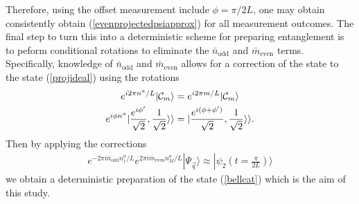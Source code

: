 \documentclass[%
  prx,%
  twocolumn,%
  preprintnumbers,%
  amsmath,%
  amssymb,%
  superscriptaddress%
]{revtex4}
\begin{document}
Therefore, using the offset measurement include $ \phi = \pi/2L$, one may obtain consistently obtain (\ref{evenprojectedpsiapprox}) for all measurement outcomes.  The final step to turn this into a deterministic scheme for preparing entanglement is to peform conditional rotations to eliminate the $ \bar{n}_\text{odd} $ and  $ \bar{m}_\text{even} $ terms.  Specifically, knowledge of $ \bar{n}_\text{odd} $ and  $ \bar{m}_\text{even} $  allows for a correction of the state to the state (\ref{projideal}) using the rotations
%
\begin{align}
e^{i 2 \pi n^a /L } | {\cal C}_m \rangle & = e^{i 2 \pi m /L } | {\cal C}_m \rangle \label{correction1} \\
e^{i \phi n^a } |\frac{e^{ i \phi' }}{\sqrt{2}},\frac{1}{\sqrt{2}}\rangle\rangle & = |\frac{e^{ i (\phi+\phi')  }}{\sqrt{2}},\frac{1}{\sqrt{2}}\rangle\rangle .
\label{correction2} 
\end{align}
%
Then by applying the corrections
%
\begin{align}
e^{-2 \pi i \bar{n}_{\text{odd}}  n^a_1/L }  e^{2 \pi i \bar{m}_{\text{even}}  n^a_M/L }  | \Psi_{\vec{q}} \rangle \approx | \psi_2 (t= \frac{\pi}{2L} ) \rangle 
\label{correction3}
\end{align}
%
we obtain a deterministic preparation of the state (\ref{bellcat}) which is the aim of this study.  
















\end{document}
